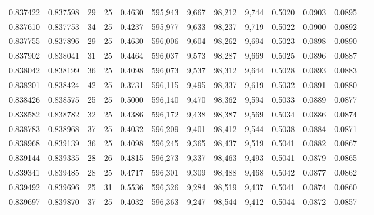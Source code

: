\begin{tabular}{rrrrrrrrrrrrr}
0.837422 & 0.837598 &    29 &  25 &                                     0.4630 & 595,943 &   9,667 &  98,212 &   9,744 & 0.5020 & 0.0903 & 0.0895 \\
0.837610 & 0.837753 &    34 &  25 &                                     0.4237 & 595,977 &   9,633 &  98,237 &   9,719 & 0.5022 & 0.0900 & 0.0892 \\
0.837755 & 0.837896 &    29 &  25 &                                     0.4630 & 596,006 &   9,604 &  98,262 &   9,694 & 0.5023 & 0.0898 & 0.0890 \\
0.837902 & 0.838041 &    31 &  25 &                                     0.4464 & 596,037 &   9,573 &  98,287 &   9,669 & 0.5025 & 0.0896 & 0.0887 \\
0.838042 & 0.838199 &    36 &  25 &                                     0.4098 & 596,073 &   9,537 &  98,312 &   9,644 & 0.5028 & 0.0893 & 0.0883 \\
0.838201 & 0.838424 &    42 &  25 &                                     0.3731 & 596,115 &   9,495 &  98,337 &   9,619 & 0.5032 & 0.0891 & 0.0880 \\
0.838426 & 0.838575 &    25 &  25 &                                     0.5000 & 596,140 &   9,470 &  98,362 &   9,594 & 0.5033 & 0.0889 & 0.0877 \\
0.838582 & 0.838782 &    32 &  25 &                                     0.4386 & 596,172 &   9,438 &  98,387 &   9,569 & 0.5034 & 0.0886 & 0.0874 \\
0.838783 & 0.838968 &    37 &  25 &                                     0.4032 & 596,209 &   9,401 &  98,412 &   9,544 & 0.5038 & 0.0884 & 0.0871 \\
0.838968 & 0.839139 &    36 &  25 &                                     0.4098 & 596,245 &   9,365 &  98,437 &   9,519 & 0.5041 & 0.0882 & 0.0867 \\
0.839144 & 0.839335 &    28 &  26 &                                     0.4815 & 596,273 &   9,337 &  98,463 &   9,493 & 0.5041 & 0.0879 & 0.0865 \\
0.839341 & 0.839485 &    28 &  25 &                                     0.4717 & 596,301 &   9,309 &  98,488 &   9,468 & 0.5042 & 0.0877 & 0.0862 \\
0.839492 & 0.839696 &    25 &  31 &                                     0.5536 & 596,326 &   9,284 &  98,519 &   9,437 & 0.5041 & 0.0874 & 0.0860 \\
0.839697 & 0.839870 &    37 &  25 &                                     0.4032 & 596,363 &   9,247 &  98,544 &   9,412 & 0.5044 & 0.0872 & 0.0857 \\

\end{tabular}
